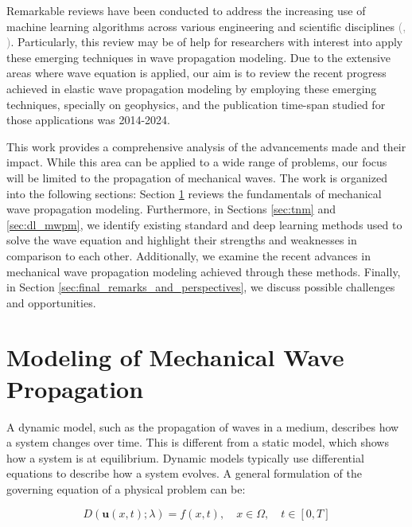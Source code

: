 \documentclass[11pt,twoside]{article}
\renewcommand{\citep}[2][]{\textcolor{gray}{(\citeauthor{#2}, \citeyear[#1]{#2})}}
\begin{document}
Remarkable reviews have been conducted to address the increasing use of machine learning algorithms across various engineering and scientific disciplines \citep{vadyala_review_2022,deng_physics-informed_2023,lino_current_2023}. Particularly, this review may be of help for researchers with interest into apply these emerging techniques in wave propagation modeling. Due to the extensive areas where wave equation is applied, our aim is to review the recent progress achieved in elastic wave propagation modeling by employing these emerging techniques, specially on geophysics, and the publication time-span studied for those applications was 2014-2024.

This work provides a comprehensive analysis of the advancements made and their impact. While this area can be applied to a wide range of problems, our focus will be limited to the propagation of mechanical waves. The work is organized into the following sections: Section \ref{sec:fordward_inverse_modeling_mechanical_waves} reviews the fundamentals of mechanical wave propagation modeling. Furthermore, in Sections \ref{sec:tnm} and \ref{sec:dl_mwpm}, we identify existing standard and deep learning methods used to solve the wave equation and highlight their strengths and weaknesses in comparison to each other. Additionally, we examine the recent advances in mechanical wave propagation modeling achieved through these methods. Finally, in Section \ref{sec:final_remarks_and_perspectives}, we discuss possible challenges and opportunities.

\section{Modeling of Mechanical Wave Propagation}\label{sec:fordward_inverse_modeling_mechanical_waves}

A dynamic model, such as the propagation of waves in a medium, describes how a system changes over time. This is different from a static model, which shows how a system is at equilibrium. Dynamic models typically use differential equations to describe how a system evolves. A general formulation of the governing equation of a physical problem can be:

\begin{equation}
D(\boldsymbol{u}(x,t); \lambda) = f(x,t), \quad x \in \Omega, \quad t \in [0, T]\label{eq:pde}
\end{equation}
\end{document}
